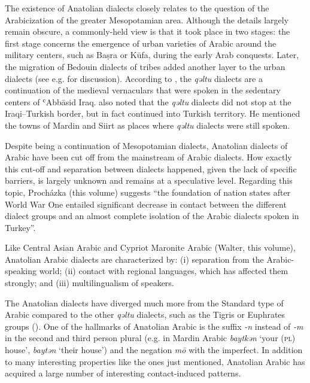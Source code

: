 \documentclass[output=paper]{langsci/langscibook}
\begin{document}
The existence of Anatolian dialects closely relates to the question of the Arabicization of the greater Mesopotamian area. Although the details largely remain obscure, a commonly-held view is that it took place in two stages: the first stage concerns the emergence of urban varieties of Arabic around the military centers, such as Ba\d{s}ra or K\={u}fa, during the early Arab conquests. Later, the migration of Bedouin dialects of tribes added another layer to the urban dialects (see e.g. \citealt{Blanc1964,Versteegh1997,Jastrow2006} for discussion). According to \cite{Blanc1964}, the \textit{qəltu} dialects are a continuation of the medieval vernaculars that were spoken in the sedentary centers of ʿAbb\={a}sid Iraq. \cite{Blanc1964} also noted that the \textit{qəltu} dialects did not stop at the Iraqi--Turkish border, but in fact continued into Turkish territory. He mentioned the towns of Mardin and Siirt as places where \textit{qəltu} dialects were still spoken.

Despite being a continuation of Mesopotamian dialects, Anatolian dialects of Arabic have been cut off from the mainstream of Arabic dialects. How exactly this cut-off and separation between dialects happened, given the lack of specific barriers, is largely unknown and remains at a speculative level. Regarding this topic, Proch\'{a}zka (this volume) suggests ``the foundation of nation states after World War One entailed significant decrease in contact between the different dialect groups and an almost complete isolation of the Arabic dialects spoken in Turkey''.

Like Central Asian Arabic and Cypriot Maronite Arabic (Walter, this volume), Anatolian Arabic dialects are characterized by: (i) separation from the Arabic-speaking world; (ii) contact with regional languages, which has affected them strongly; and (iii) multilingualism of speakers. %

The Anatolian dialects have diverged much more from the Standard type of Arabic compared to the other \textit{qəltu} dialects, such as the Tigris or Euphrates groups (\citealt{Jastrow2011iraq}). One of the hallmarks of Anatolian Arabic is the suffix \textit{-n} instead of \textit{-m} in the second and third person plural (e.g. in Mardin Arabic \textit{baytkən} `your (\textsc{pl}) house', \textit{baytən} `their house') and the negation \textit{m\={o}} with the imperfect. In addition to many interesting properties like the ones just mentioned, Anatolian Arabic has acquired a large number of interesting contact-induced patterns.
\end{document}
